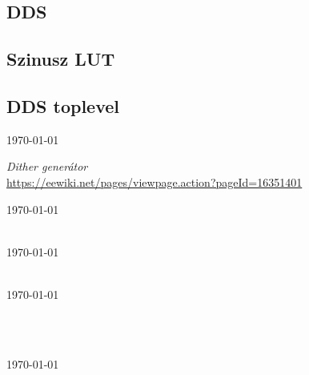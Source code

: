\documentclass[a4paper,11pt]{article}
\begin{document}
\subsection{DDS}



\subsection{Szinusz LUT}



\subsection{DDS toplevel}




\pagebreak
\begin{thebibliography}{}


\textit{}
\url{  }
\today


\textit{Dither generátor}\\
\url{https://eewiki.net/pages/viewpage.action?pageId=16351401}

\today


\textit{}\\
\url{}
\today


\textit{}\\
\url{}
\today


\textit{}\\



\textit{}\\
\url{}
\today


\end{thebibliography}
\end{document}
